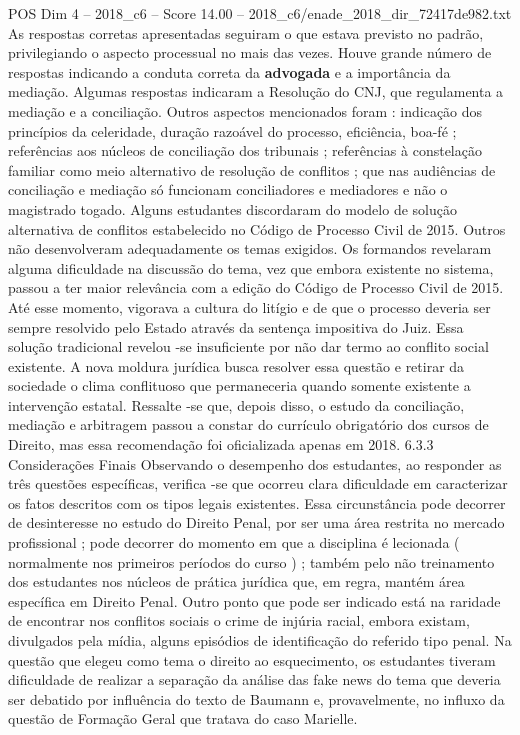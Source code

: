 \begin{textsample}{POS Dim 4 – 2018\_c6 – Score 14.00 – 2018\_c6/enade\_2018\_dir\_72417de982.txt}
As respostas corretas apresentadas seguiram o que estava previsto no padrão, privilegiando o aspecto processual no mais das vezes.
Houve grande número de respostas indicando a conduta correta da \textbf{advogada} e a importância da mediação.
Algumas respostas indicaram a Resolução do CNJ, que regulamenta a mediação e a conciliação.
Outros aspectos mencionados foram : indicação dos princípios da celeridade, duração razoável do processo, eficiência, boa-fé ; referências aos núcleos de conciliação dos tribunais ; referências à constelação familiar como meio alternativo de resolução de conflitos ; que nas audiências de conciliação e mediação só funcionam conciliadores e mediadores e não o magistrado togado.
Alguns estudantes discordaram do modelo de solução alternativa de conflitos estabelecido no Código de Processo Civil de 2015.
Outros não desenvolveram adequadamente os temas exigidos.
Os formandos revelaram alguma dificuldade na discussão do tema, vez que embora existente no sistema, passou a ter maior relevância com a edição do Código de Processo Civil de 2015.
Até esse momento, vigorava a cultura do litígio e de que o processo deveria ser sempre resolvido pelo Estado através da sentença impositiva do Juiz.
Essa solução tradicional revelou -se insuficiente por não dar termo ao conflito social existente.
A nova moldura jurídica busca resolver essa questão e retirar da sociedade o clima conflituoso que permaneceria quando somente existente a intervenção estatal.
Ressalte -se que, depois disso, o estudo da conciliação, mediação e arbitragem passou a constar do currículo obrigatório dos cursos de Direito, mas essa recomendação foi oficializada apenas em 2018. 6.3.3 Considerações Finais Observando o desempenho dos estudantes, ao responder as três questões específicas, verifica -se que ocorreu clara dificuldade em caracterizar os fatos descritos com os tipos legais existentes.
Essa circunstância pode decorrer de desinteresse no estudo do Direito Penal, por ser uma área restrita no mercado profissional ; pode decorrer do momento em que a disciplina é lecionada ( normalmente nos primeiros períodos do curso ) ; também pelo não treinamento dos estudantes nos núcleos de prática jurídica que, em regra, mantém área específica em Direito Penal.
Outro ponto que pode ser indicado está na raridade de encontrar nos conflitos sociais o crime de injúria racial, embora existam, divulgados pela mídia, alguns episódios de identificação do referido tipo penal.
Na questão que elegeu como tema o direito ao esquecimento, os estudantes tiveram dificuldade de realizar a separação da análise das fake news do tema que deveria ser debatido por influência do texto de Baumann e, provavelmente, no influxo da questão de Formação Geral que tratava do caso Marielle.

\end{textsample}
